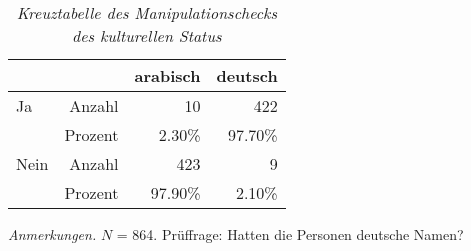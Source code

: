 \begin{table}[htb]
    \caption[Kreuztabelle Manipulationscheck kultureller Status]{\textit {Kreuztabelle des Manipulationschecks des kulturellen Status}} 
    \label{KT_kult}
    \centering
    \begin{adjustbox}{width=6.5cm} %
    \small
    \begin{tabular}{lrrr}
      \hline
        &   & arabisch & deutsch \\
      \hline
    Ja   & Anzahl  & 10      & 422      \\
         & Prozent & 2.30\%  & 97.70\%  \\
    Nein & Anzahl  & 423     & 9        \\
         & Prozent & 97.90\% & 2.10\%   \\
       \hline
    \end{tabular}
    \end{adjustbox}
    
    \begin{tablenotes}
        \item \textit{Anmerkungen.} \( N \) = 864. Prüffrage: Hatten die Personen deutsche Namen?
      \end{tablenotes}
    \end{table}